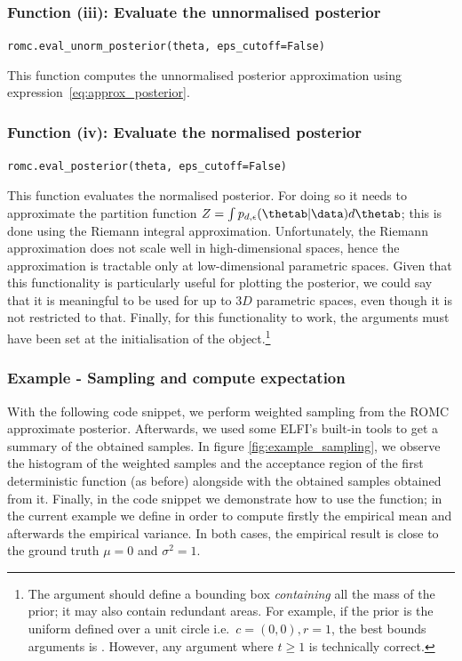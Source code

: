 \subsubsection*{Function (iii): Evaluate the unnormalised posterior}
\texttt{romc.eval_unorm_posterior(theta, eps_cutoff=False)}
\vspace{5mm}

\noindent
This function computes the unnormalised posterior approximation using
expression~\eqref{eq:approx_posterior}.

\subsubsection*{Function (iv): Evaluate the normalised posterior}
\texttt{romc.eval_posterior(theta, eps_cutoff=False)}
\vspace{5mm}

\noindent
This function evaluates the normalised posterior. For doing so it
needs to approximate the partition function
$Z = \int p_{d,\epsilon}(\thetab|\data)d\thetab$; this is done using
the Riemann integral approximation. Unfortunately, the Riemann
approximation does not scale well in high-dimensional spaces, hence
the approximation is tractable only at low-dimensional parametric
spaces. Given that this functionality is particularly useful for
plotting the posterior, we could say that it is meaningful to be used
for up to $3D$ parametric spaces, even though it is not restricted to
that. Finally, for this functionality to work, the 
arguments must have been set at the initialisation of the
 object.\footnote{The argument 
  should define a bounding box \emph{containing} all the mass of the
  prior; it may also contain redundant areas. For example, if the
  prior is the uniform defined over a unit circle i.e.\
  $c=(0,0), r=1$, the best bounds arguments is
  . However, any argument
   where $t\geq1$ is technically
  correct.}

\subsubsection*{Example - Sampling and compute expectation}

With the following code snippet, we perform weighted sampling from the
ROMC approximate posterior. Afterwards, we used some ELFI's built-in
tools to get a summary of the obtained samples. In figure
\ref{fig:example_sampling}, we observe the histogram of the weighted
samples and the acceptance region of the first deterministic function
(as before) alongside with the obtained samples obtained from
it. Finally, in the code snippet we demonstrate how to use the
 function; in the current example we
define \pinline{h} in order to compute firstly the empirical mean and
afterwards the empirical variance. In both cases, the empirical result
is close to the ground truth $\mu = 0$ and $\sigma^2 = 1$.

